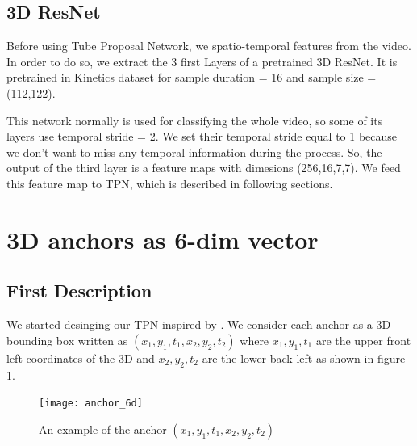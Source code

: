 \subsection{3D ResNet}
Before using Tube Proposal Network, we spatio-temporal features from the video. In order to do so, we extract the 3 first Layers of a
pretrained 3D ResNet. It is pretrained in Kinetics dataset \cite{DBLP:journals/corr/KayCSZHVVGBNSZ17} for sample duration = 16 and
sample size = (112,122). \par
This network normally is used for classifying the whole video, so some of its layers use temporal stride = 2.
We set their temporal stride equal to 1 because we don't want to miss any temporal information during the process.
So, the output of the third layer is a feature maps with dimesions (256,16,7,7). We feed this feature map to TPN, which is described
in following sections.

\section{ 3D anchors as 6-dim vector}
\subsection{First Description}
We started desinging our TPN inspired by \cite{DBLP:journals/corr/HouCS17}. We consider each anchor as a 3D bounding box written as
$(x_1, y_1, t_1, x_2, y_2, t_2)$ where $x_1, y_1, t_1$
are the upper front left coordinates of the 3D and $x_2, y_2, t_2$ are the lower back left as shown in figure \ref{fig:anchor_6d}.
\begin{figure}[h]
  \centering
  \texttt{[image: anchor\_6d]}
  \caption{An example of the anchor $(x_1,y_1,t_1,x_2,y_2,t_2)$}
  \label{fig:anchor_6d}
\end{figure}

